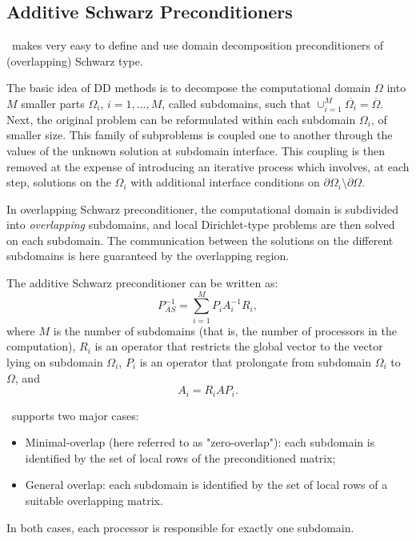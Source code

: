 \subsection{Additive Schwarz Preconditioners}
\label{sec:additive}

\ifpack\ makes very easy to define and use domain decomposition
preconditioners of (overlapping) Schwarz type.

The basic idea of DD methods is to decompose the
computational domain $\Omega$ into $M$ smaller parts $\Omega_i$,
$i=1,\ldots,M$, called subdomains, such that $\cup_{i=1}^{M}
\overline{\Omega_i} = \overline{\Omega}$.  Next, the original problem can
be reformulated within each subdomain $\Omega_i$, of smaller size. This
family of subproblems is coupled one to another through the values of the
unknown solution at subdomain interface. This coupling is then removed at
the expense of introducing an iterative process which involves, at each
step, solutions on the $\Omega_i$ with additional interface conditions on
$\partial \Omega_i \setminus \partial \Omega$.

In overlapping Schwarz preconditioner, the computational domain is
subdivided into {\sl overlapping} subdomains, and local Dirichlet-type
problems are then solved on each subdomain.  The communication between the
solutions on the different subdomains is here guaranteed by the overlapping
region. 

The additive Schwarz preconditioner can be written as:
\begin{equation}
\label{eq:as}
P_{AS}^{-1} = \sum_{i=1}^M P_i A_i^{-1} R_i ,
\end{equation}
where $M$ is the number of subdomains (that is, the number of processors in
the computation), $R_i$ is an operator that restricts the global 
vector to the vector lying on subdomain $\Omega_i$, $P_i$ is an operator that
prolongate from subdomain $\Omega_i$ to $\Omega$, and
\begin{equation}
\label{eq:Ai}
A_i = R_i A P_i.
\end{equation}

\ifpack\ supports two major cases:
\begin{itemize}
\item Minimal-overlap (here referred to as "zero-overlap"): each subdomain
is identified by the set of local rows of the preconditioned matrix;
\item General overlap: each subdomain is identified by the set of local rows
of a suitable overlapping matrix.
\end{itemize}
In both cases, each processor is responsible for exactly one subdomain.

